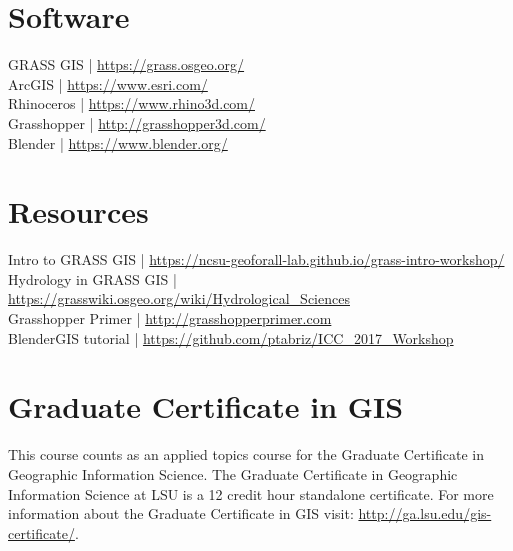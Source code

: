 \documentclass[11pt,article,oneside]{memoir}
\begin{document}
\section{Software}
\begin{multicols}{2}
\raggedright
GRASS GIS | \url{https://grass.osgeo.org/} \\
ArcGIS | \url{https://www.esri.com/} \\
Rhinoceros | \url{https://www.rhino3d.com/}\\
Grasshopper | \url{http://grasshopper3d.com/}\\
Blender | \url{https://www.blender.org/}
\end{multicols}

\section{Resources}
Intro to GRASS GIS | \url{https://ncsu-geoforall-lab.github.io/grass-intro-workshop/}\\
Hydrology in GRASS GIS | \url{https://grasswiki.osgeo.org/wiki/Hydrological_Sciences}\\
Grasshopper Primer | \url{http://grasshopperprimer.com}\\
BlenderGIS tutorial | \url{https://github.com/ptabriz/ICC_2017_Workshop}

\section{Graduate Certificate in GIS}
This course counts as an applied topics course for the 
Graduate Certificate in Geographic Information Science.
The Graduate Certificate in Geographic Information Science at LSU 
is a 12 credit hour standalone certificate. 
For more information about the Graduate Certificate in GIS visit: 
\url{http://ga.lsu.edu/gis-certificate/}.
\end{document}

